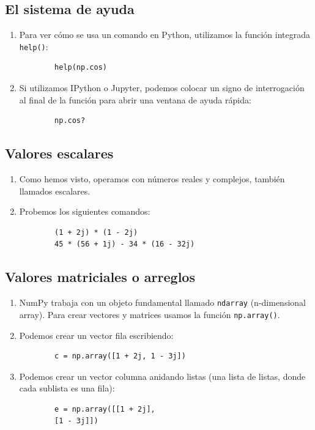 \documentclass[11pt,a4paper,openany]{book}
\begin{document}
\subsection{El sistema de ayuda}

\begin{enumerate}
	\item Para ver cómo se usa un comando en Python, utilizamos la función integrada \texttt{help()}:
	\begin{verbatim}
		help(np.cos)
	\end{verbatim}
	\item Si utilizamos IPython o Jupyter, podemos colocar un signo de interrogación al final de la función para abrir una ventana de ayuda rápida:
	\begin{verbatim}
		np.cos?
	\end{verbatim}
\end{enumerate}

\subsection{Valores escalares}

\begin{enumerate}
	\item Como hemos visto, operamos con números reales y complejos, también llamados escalares.
	\item Probemos los siguientes comandos:
	\begin{verbatim}
		(1 + 2j) * (1 - 2j)
		45 * (56 + 1j) - 34 * (16 - 32j)
	\end{verbatim}
\end{enumerate}

\subsection{Valores matriciales o arreglos}

\begin{enumerate}
	\item NumPy trabaja con un objeto fundamental llamado \texttt{ndarray} (n-dimensional array). Para crear vectores y matrices usamos la función \texttt{np.array()}.
	\item Podemos crear un vector fila escribiendo:
	\begin{verbatim}
		c = np.array([1 + 2j, 1 - 3j])
	\end{verbatim}
	
	\item Podemos crear un vector columna anidando listas (una lista de listas, donde cada sublista es una fila):
	\begin{verbatim}
		e = np.array([[1 + 2j], 
		[1 - 3j]])
	\end{verbatim}
\end{enumerate}
\end{document}
